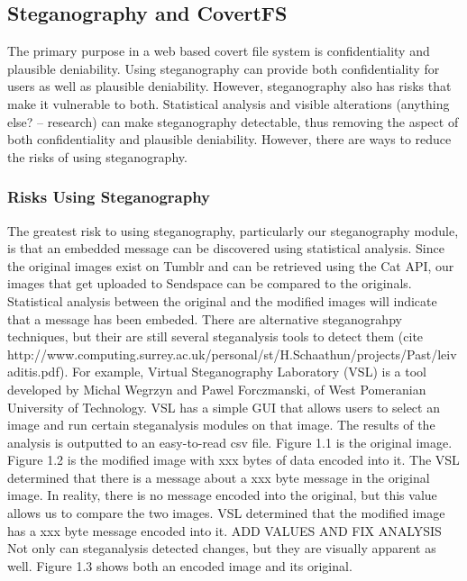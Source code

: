\subsection{Steganography and CovertFS}
The primary purpose in a web based covert file system is confidentiality and plausible deniability. Using steganography can provide both confidentiality for users as well as plausible deniability. However, steganography also has risks that make it vulnerable to both. Statistical analysis and visible alterations (anything else? -- research) can make steganography detectable, thus removing the aspect of both confidentiality and plausible deniability. However, there are ways to reduce the risks of using steganography. 

\subsubsection{Risks Using Steganography}
The greatest risk to using steganography, particularly our steganography module, is that an embedded message can be discovered using statistical analysis. Since the original images exist on Tumblr and can be retrieved using the Cat API, our images that get uploaded to Sendspace can be compared to the originals. Statistical analysis between the original and the modified images will indicate that a message has been embeded. There are alternative steganograhpy techniques, but their are still several steganalysis tools to detect them (cite http://www.computing.surrey.ac.uk/personal/st/H.Schaathun/projects/Past/leivaditis.pdf). For example, Virtual Steganography Laboratory (VSL) is a tool developed by Michal Wegrzyn and Pawel Forczmanski, of West Pomeranian University of Technology. VSL has a simple GUI that allows users to select an image and run certain steganalysis modules on that image. The results of the analysis is outputted to an easy-to-read csv file. Figure 1.1 is the original image. Figure 1.2 is the modified image with xxx bytes of data encoded into it. 
The VSL determined that there is a message about a xxx byte message in the original image. In reality, there is no message encoded into the original, but this value allows us to compare the two images. VSL determined that the modified image has a xxx byte message encoded into it. ADD VALUES AND FIX ANALYSIS Not only can steganalysis detected changes, but they are visually apparent as well. Figure 1.3 shows both an encoded image and its original.
